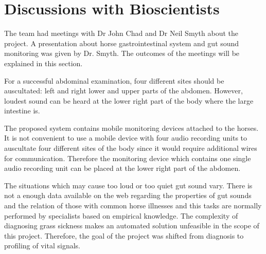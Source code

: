 \section{Discussions with Bioscientists}
The team had meetings with Dr John Chad and Dr Neil Smyth  about the project. A presentation about horse gastrointestinal system and gut sound monitoring was given by Dr. Smyth. The outcomes of the meetings will be explained in this section. 

For a successful abdominal examination, four different sites should be auscultated: left and right lower and upper parts of the abdomen. However, loudest sound can be heard at the lower right part of the body where the large intestine is. 

The proposed system contains mobile monitoring devices attached to the horses. It is not convenient to use a mobile device with four audio recording units to auscultate four different sites of the body since it would require additional wires for communication. Therefore the monitoring device which contains one single audio recording unit can be placed at the lower right part of the abdomen.

The situations which may cause too loud or too quiet gut sound vary. There is not a enough data available on the web regarding the properties of gut sounds and the relation of those with common horse illnesses and this tasks are normally performed by specialists based on empirical knowledge. The complexity of diagnosing grass sickness makes an automated solution unfeasible in the scope of this project. Therefore, the goal of the project was shifted from diagnosis to profiling of vital signals.
